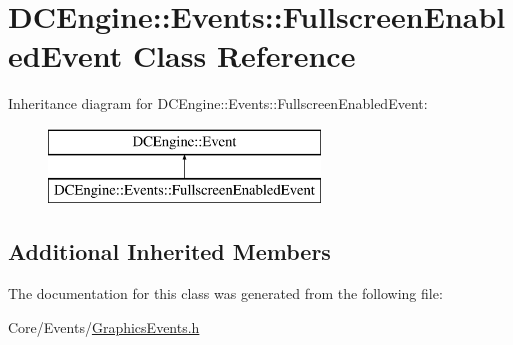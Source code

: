 \hypertarget{classDCEngine_1_1Events_1_1FullscreenEnabledEvent}{\section{D\-C\-Engine\-:\-:Events\-:\-:Fullscreen\-Enabled\-Event Class Reference}
\label{classDCEngine_1_1Events_1_1FullscreenEnabledEvent}
}
Inheritance diagram for D\-C\-Engine\-:\-:Events\-:\-:Fullscreen\-Enabled\-Event\-:\begin{figure}[H]
\begin{center}
\leavevmode
\includegraphics[height=2.000000cm]{classDCEngine_1_1Events_1_1FullscreenEnabledEvent}
\end{center}
\end{figure}
\subsection*{Additional Inherited Members}


The documentation for this class was generated from the following file\-:\begin{DoxyCompactItemize}
\item 
Core/\-Events/\hyperlink{GraphicsEvents_8h}{Graphics\-Events.\-h}\end{DoxyCompactItemize}
